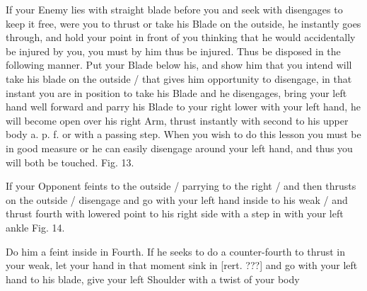 \newpage


\newpage

\exercise{}
If your Enemy lies with straight blade before you and seek with
disengages to keep it free, were you to thrust or take his Blade on
the outside, he instantly goes through, and hold your point in front
of you thinking that he would accidentally be injured by you, you must
by him thus be injured. Thus be disposed in the following manner. Put
your Blade below his, and show him that you intend will take his blade
on the outside / that gives him
opportunity to disengage, in that instant you are in position to take his Blade and he disengages, bring your left hand well forward and parry his Blade to your right lower with your left hand, he will become open over his right Arm, thrust instantly with second to his upper body a. p. f. or with a passing step. When you wish to do this lesson you must be in good measure or he can easily disengage around your left hand, and thus you will both be touched. Fig. 13.

\exercise{}
If your Opponent feints to the outside / parrying to the right / and
then thrusts on the outside / disengage and go with your left hand
inside to his weak / and thrust fourth with lowered point to his right
side with a step in with your left ankle Fig. 14.

\exercise{}
Do him a feint inside in Fourth. If he seeks to do a counter-fourth to thrust in your weak, let your hand in that moment sink in [rert. ???] and go with your left hand to his blade, give your left Shoulder with a twist of your body

